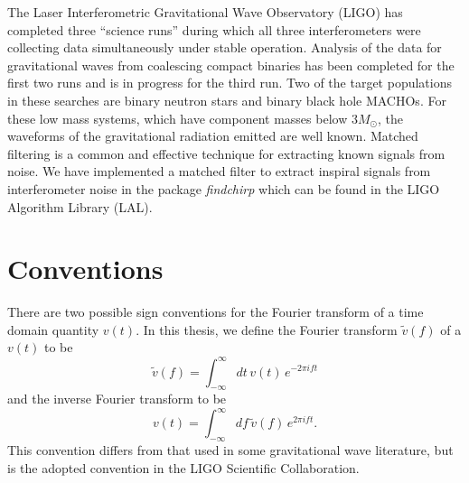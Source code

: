 The Laser Interferometric Gravitational Wave Observatory
(LIGO)\cite{Barish:1999} has completed three ``science runs'' during which all
three interferometers were collecting data simultaneously under stable
operation. Analysis of the data for gravitational waves from coalescing
compact binaries has been completed for the first two
runs\cite{LIGOS1iul,LIGOS2iul} and is in progress for the third run. Two of
the target populations in these searches are binary neutron
stars\cite{thorne.k:1987} and binary black hole
MACHOs\cite{Finn:1996dd,Nakamura:1997sm}. For these low mass systems, which
have component masses below $3 M_\odot$, the waveforms of the gravitational
radiation emitted are well known\cite{Blanchet:1995ez,Blanchet:1996pi}.
Matched filtering is a common and effective technique for extracting known
signals from noise\cite{wainstein:1962}. We have implemented a matched filter
to extract inspiral signals from interferometer noise in the package
\emph{findchirp} which can be found in the LIGO Algorithm Library
(LAL)\cite{LAL}.


\section{Conventions}
There are two possible sign conventions for the Fourier transform of a time
domain quantity $v(t)$. In this thesis, we define the Fourier transform
$\tilde{v}(f)$ of a $v(t)$ to be
\begin{equation}
\label{eq:ft}
\tilde{v}(f)=\int_{-\infty}^\infty dt\,v(t)\, e^{- 2 \pi i f t}
\end{equation}
and the inverse Fourier transform to be 
\begin{equation}
\label{eq:ift}
v(t)=\int_{-\infty}^\infty df\,\tilde{v}(f)\, e^{2 \pi i f t}.
\end{equation}
This convention differs from that used in some gravitational wave literature,
but is the adopted convention in the LIGO Scientific Collaboration.


